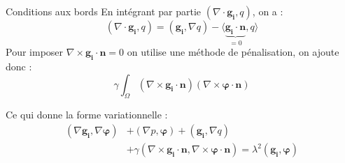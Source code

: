 \documentclass{beamer}
\newcommand{\grad}{{\nabla}}
\newcommand{\rot}{{\nabla\times}}
\renewcommand{\div}{{\nabla\cdot}}
\begin{document}
\begin{frame}{Conditions aux bords}
En intégrant par partie $(\div\bm{g_i},q)$, on a :
\[
(\div\bm{g_i},q) = (\bm{g_i},\grad q) - \langle \underbrace{\bm{g_i}\cdot \bm{n}}_{=0}, q \rangle
\] 
Pour imposer $\rot\bm{g_i}\cdot\bm{n}=0$ on utilise une méthode de pénalisation, on ajoute donc :
\[
\gamma\int_\Omega (\rot\bm{g_i}\cdot\bm{n})(\rot\bm{\varphi}\cdot\bm{n})
\]
\begin{block}{Ce qui donne la forme variationnelle :}
\[\begin{aligned}
(\grad\bm{g_i},\grad\bm{\varphi}) &+ (\grad p, \bm{\varphi}) + (\bm{g_i}, \grad q)\\
&+ \gamma(\rot\bm{g_i}\cdot\bm{n},\rot\bm{\varphi}\cdot\bm{n}) = \lambda^2(\bm{g_i},\bm{\varphi})
\end{aligned}\]
\end{block}
\end{frame}
\end{document}
